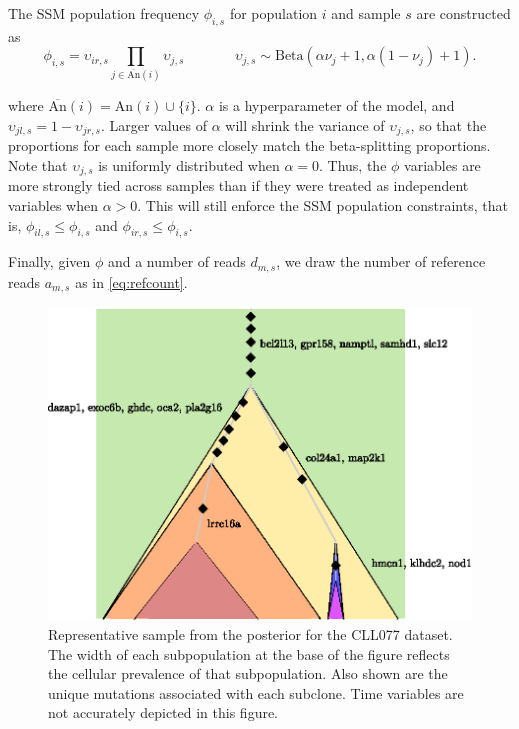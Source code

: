 \documentclass{bioinfo}
\newcommand{\Beta}{\mathrm{Beta} }
\newcommand{\ancestors}{\mathrm{An} }
\newcommand{\bancestors}{\overline{\ancestors}}
\begin{document}
\begin{methods}
The SSM population frequency $\phi_{i,s}$ for population $i$ and sample $s$ are constructed as 
\begin{equation}
\phi_{i,s} = \upsilon_{ir,s} \prod_{j \in \bancestors(i) } \upsilon_{j,s} \;\;\;\;\;\;\;\;\;\;\;\;\; \upsilon_{j,s} \sim \Beta(\alpha\nu_j + 1, \alpha(1-\nu_j) + 1) \label{eq:obs}.
\end{equation}

where $\bancestors(i) = \ancestors(i) \cup \{i\}$.  $\alpha$ is a hyperparameter of the model, and $\upsilon_{jl,s} = 1-\upsilon_{jr,s}$.  Larger values of $\alpha$ will shrink the variance of $\upsilon_{j,s}$, so that the proportions for each sample more closely match the beta-splitting proportions.  Note that $\upsilon_{j,s}$ is uniformly distributed when $\alpha=0$.  Thus, the $\phi$ variables are more strongly tied across samples than if they were treated as independent variables when $\alpha > 0$.  This will still enforce the SSM population constraints, that is, $\phi_{il,s} \leq \phi_{i,s}$ and $\phi_{ir,s} \leq \phi_{i,s}$.   

Finally, given $\phi$ and a number of reads $d_{m,s}$, we draw the number of reference reads $a_{m,s}$ as in \eqref{eq:refcount}.

\begin{figure}
\centering
\includegraphics[width=0.9\columnwidth]{../figures/CLL_growth_cartoon.eps}
\caption{Representative sample from the posterior for the CLL077 dataset.  The width of each subpopulation at the base of the figure reflects the cellular prevalence of that subpopulation.  Also shown are the unique mutations associated with each subclone.  Time variables are not accurately depicted in this figure.}
\label{fig:CLL_result}
\end{figure} 



\end{methods}
\end{document}
